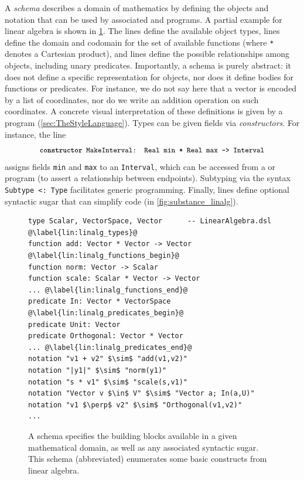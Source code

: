 A \Domain{} \emph{schema} describes a domain of mathematics by defining the objects and notation that can be used by associated \Substance{} and \Style{} programs.  A partial example for linear algebra is shown in \cref{fig:domain_linalg}.  The  lines define the available object types,  lines define the domain and codomain for the set of available functions (where \texttt{*} denotes a Cartesian product), and  lines define the possible relationships among objects, including unary predicates.  Importantly, a \Domain{} schema is purely abstract: it does not define a specific representation for objects, nor does it define bodies for functions or predicates. For instance, we do not say here that a vector is encoded by a list of coordinates, nor do we write an addition operation on such coordinates.  A concrete visual interpretation of these definitions is given by a \Style{} program (\cref{sec:TheStyleLanguage}).  Types can be given fields via \emph{constructors}. For instance, the line
\[
   \text{\small\texttt{\textbf{constructor} MakeInterval: Real min * Real max -> Interval}}
\]
assigns fields \texttt{min} and \texttt{max} to an \texttt{Interval}, which can be accessed from a \Substance{} or \Style{} program (\eg to assert a relationship between endpoints).  Subtyping via the syntax \texttt{Subtype <: Type} facilitates generic programming.  Finally,  lines define optional syntactic sugar that can simplify code (\eg in \cref{fig:substance_linalg}).

\begin{figure}
\begin{mdframed}[style=DSLCode]
\begin{lstlisting}[language=Elem,escapechar=@]
type Scalar, VectorSpace, Vector      -- LinearAlgebra.dsl @\label{lin:linalg_types}@
function add: Vector * Vector -> Vector @\label{lin:linalg_functions_begin}@
function norm: Vector -> Scalar
function scale: Scalar * Vector -> Vector
... @\label{lin:linalg_functions_end}@
predicate In: Vector * VectorSpace @\label{lin:linalg_predicates_begin}@
predicate Unit: Vector
predicate Orthogonal: Vector * Vector
... @\label{lin:linalg_predicates_end}@
notation "v1 + v2" $\sim$ "add(v1,v2)"
notation "|y1|" $\sim$ "norm(y1)"
notation "s * v1" $\sim$ "scale(s,v1)"
notation "Vector v $\in$ V" $\sim$ "Vector a; In(a,U)"
notation "v1 $\perp$ v2" $\sim$ "Orthogonal(v1,v2)"
...
\end{lstlisting}
\end{mdframed}
   \caption{A \Domain{} schema specifies the building blocks available in a given mathematical domain, as well as any associated syntactic sugar.  This schema (abbreviated) enumerates some basic constructs from linear algebra.\label{fig:domain_linalg}}
\end{figure}


